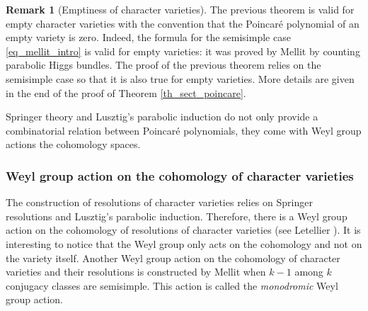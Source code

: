 \documentclass[11pt]{article}
\theoremstyle{definition}
\newtheorem{remark}[definition]{Remark}
\theoremstyle{plain}
\begin{document}
\begin{remark}[Emptiness of character varieties]
The previous theorem is valid for empty character varieties with the convention that the Poincaré polynomial of an empty variety is zero. Indeed, the formula for the semisimple case \eqref{eq_mellit_intro} is valid for empty varieties: it was proved by Mellit by counting parabolic Higgs bundles. The proof of the previous theorem relies on the semisimple case so that it is also true for empty varieties. More details are given in the end of the proof of Theorem \ref{th_sect_poincare}.
\end{remark}

Springer theory and Lusztig's parabolic induction do not only provide a combinatorial relation between Poincaré polynomials, they come with Weyl group actions the cohomology spaces.

\subsubsection{Weyl group action on the cohomology of character varieties}
The construction of resolutions of character varieties relies on Springer resolutions and Lusztig's parabolic induction. Therefore, there is a Weyl group action on the cohomology of resolutions of character varieties (see Letellier \cite{Letellier13}). It is interesting to notice that the Weyl group only acts on the cohomology and not on the variety itself. Another Weyl group action on the cohomology of character varieties and their resolutions is constructed by Mellit \cite{Mellit2019} when $k-1$ among $k$ conjugacy classes are semisimple. This action is called the \textit{monodromic} Weyl group action.
\end{document}
